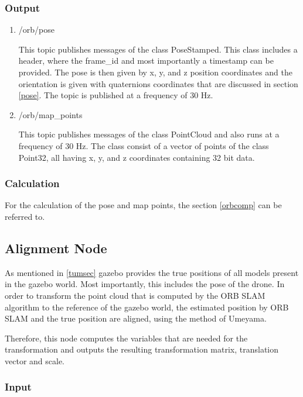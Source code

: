    \subsubsection{Output}
	
	\begin{enumerate}
	\item{/orb/pose}
	
	This topic publishes messages of the class PoseStamped. This class includes a header, where the frame\_id and most importantly a timestamp can be provided. 
	The pose is then given by x, y, and z position coordinates and the orientation is given with quaternions coordinates that are discussed in section \ref{pose}. 
	The topic is published at a frequency of 30 Hz. 
	
	\item{/orb/map\_points}
	
	This topic publishes messages of the class PointCloud and also runs at a frequency of 30 Hz. The class consist of a vector of points of the 
	class Point32, all having x, y, and z coordinates containing 32 bit data. 
	 

	\end{enumerate}
	
	\subsubsection{Calculation}
	
	For the calculation of the pose and map points, the section \ref{orbcomp} can be referred to. 
	

	
	\subsection{Alignment Node}
	
	As mentioned in \ref{tumsec} gazebo provides the true positions of all models present in the gazebo world. Most importantly, this includes 
	the pose of the drone. In order to transform the point cloud that is computed by the ORB SLAM algorithm to the reference of the gazebo world, the estimated 
	position by ORB SLAM and the true position are aligned, using the method of Umeyama. 
	
	Therefore, this node computes the variables that are needed for the transformation and outputs the resulting transformation matrix, translation vector and scale. 
	
	
	\subsubsection{Input}
	
